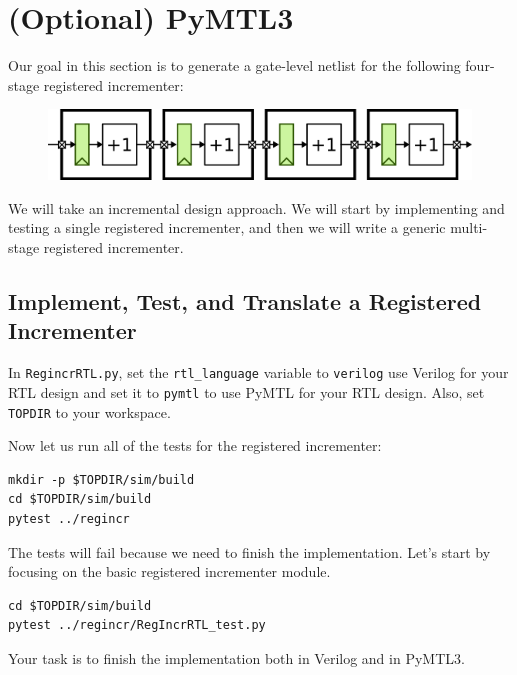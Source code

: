 \documentclass[a4paper,12pt,twoside]{article}
\begin{document}
\newpage
\section{(Optional) PyMTL3}\label{SPyMTL}
Our goal in this section is to generate a gate-level netlist for the following four-stage registered incrementer:
\begin{figure}[H]
    \centering
    \includegraphics[width=\textwidth]{images/57.png}
\end{figure}
We will take an incremental design approach. We will start by implementing and testing a single registered incrementer, and then we will write a generic multi-stage registered incrementer.
\subsection{Implement, Test, and Translate a Registered Incrementer}\label{SPyMTL1}
In \texttt{RegincrRTL.py}, set the \texttt{rtl\_language} variable to \texttt{verilog} use Verilog for your RTL design and set it to \texttt{pymtl} to use PyMTL for your RTL design. Also, set \texttt{TOPDIR} to your workspace.

Now let us run all of the tests for the registered incrementer:
\begin{verbatim}
mkdir -p $TOPDIR/sim/build
cd $TOPDIR/sim/build
pytest ../regincr
\end{verbatim}
The tests will fail because we need to finish the implementation. Let’s start by focusing on the basic registered incrementer module.
\begin{verbatim}
cd $TOPDIR/sim/build
pytest ../regincr/RegIncrRTL_test.py
\end{verbatim}

Your task is to finish the implementation both in Verilog and in PyMTL3.
\end{document}
